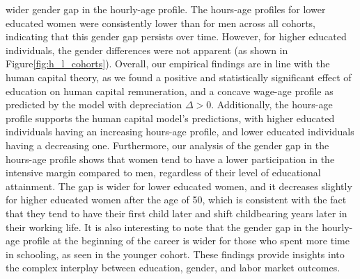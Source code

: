 \documentclass[12pt]{article}
\begin{document}
wider gender gap in the hourly-age profile.
\newline
The hours-age
profiles for lower educated women were consistently lower than for men across all cohorts, indicating that this gender
gap persists over time. However, for higher educated individuals, the gender differences were not apparent (as shown in
Figure\ref{fig:h_l_cohorts}).
\newline
Overall, our empirical findings are in line with the human capital theory, as we found a positive and statistically
significant effect of education on human capital remuneration, and a concave wage-age profile as predicted by the model
with depreciation $\Delta > 0$. Additionally, the hours-age profile supports the human capital model's predictions, with
higher educated individuals having an increasing hours-age profile, and lower educated individuals having a decreasing
one. Furthermore, our analysis of the gender gap in the hours-age profile shows that women tend to have a lower participation in
the intensive margin compared to men, regardless of their level of educational attainment. The gap is wider for lower educated
women, and it decreases slightly for higher educated women after the age of 50, which is consistent with the fact that
they tend to have their first child later and shift childbearing years later in their working life. It is also
interesting to note that the gender gap in the hourly-age profile at the beginning of the career is wider for those who
spent more time in schooling, as seen in the younger cohort. These findings provide insights into the complex interplay
between education, gender, and labor market outcomes.
\end{document}
